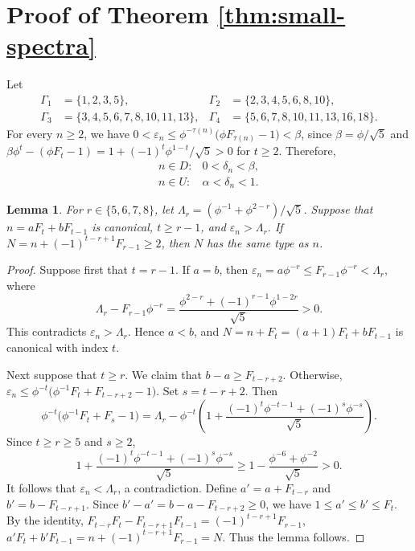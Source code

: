 \documentclass[11pt]{amsart}
\newtheorem{lemma}[theorem]{Lemma}
\theoremstyle{definition}
\newcommand{\eps}{\varepsilon}
\begin{document}
\section{Proof of Theorem \ref{thm:small-spectra}}
Let
\[
\begin{aligned}
\Gamma_1&=\{1,2,3,5\},&
\Gamma_2&=\{2,3,4,5,6,8,10\},\\
\Gamma_3&=\{3,4,5,6,7,8,10,11,13\},&
\Gamma_4&=\{5,6,7,8,10,11,13,16,18\}.
\end{aligned}
\]
For every $n\geq2$, we have $0<\eps_n\leq\phi^{-\tau(n)}\bigl(\phi F_{\tau(n)}-1\bigr)<\beta$, since $\beta=\phi/\sqrt5$ and $\beta\phi^t-(\phi F_t-1)=1+(-1)^t\phi^{1-t}/\sqrt5>0$ for $t\ge2$. Therefore,
\begin{equation}\label{eq:phase-bounds}
\begin{array}{ll}
n\in D:&0<\delta_n<\beta,\\
n\in U:&\alpha<\delta_n<1.
\end{array}
\end{equation}

\begin{lemma}\label{lem:exact-shift}
For $r\in\{5,6,7,8\}$, let $\Lambda_r=(\phi^{-1}+\phi^{2-r})/\sqrt5$. Suppose that $n=aF_t+bF_{t-1}$ is canonical, $t\geq r-1$, and
$\eps_n>\Lambda_r$. If
$N=n+(-1)^{t-r+1}F_{r-1}\geq2$, then $N$ has the same type as
$n$.
\end{lemma}

\begin{proof}
Suppose first that  $t=r-1$. If $a=b$, then $\eps_n=a\phi^{-r}\leq F_{r-1}\phi^{-r}<\Lambda_r$, where
\[
\Lambda_r-F_{r-1}\phi^{-r}
=\frac{\phi^{2-r}+(-1)^{r-1}\phi^{1-2r}}{\sqrt5}>0.
\]
This contradicts $\eps_n>\Lambda_r$. Hence $a<b$, and $N=n+F_t=(a+1)F_t+bF_{t-1}$ is canonical with index $t$.

Next suppose that $t\geq r$. We claim that $b-a\geq F_{t-r+2}$. Otherwise, $\eps_n\leq\phi^{-t}\bigl(\phi^{-1}F_t+F_{t-r+2}-1\bigr)$. Set $s=t-r+2$. Then
\[
\phi^{-t}\bigl(\phi^{-1}F_t+F_s-1\bigr)
=\Lambda_r-\phi^{-t}\left(
1+\frac{(-1)^t\phi^{-t-1}+(-1)^s\phi^{-s}}{\sqrt5}
\right).
\]
Since $t\geq r\geq5$ and $s\geq2$,
\[
1+\frac{(-1)^t\phi^{-t-1}+(-1)^s\phi^{-s}}{\sqrt5}
\geq
1-\frac{\phi^{-6}+\phi^{-2}}{\sqrt5}>0.
\]
It follows that $\eps_n<\Lambda_r$, a contradiction. Define $a'=a+F_{t-r}$ and $b'=b-F_{t-r+1}$. Since $b'-a'=b-a-F_{t-r+2}\geq0$, we have $1\leq a'\leq b'\leq F_t$. By the identity, $F_{t-r}F_t-F_{t-r+1}F_{t-1}=(-1)^{t-r+1}F_{r-1}$, $a'F_t+b'F_{t-1}=n+(-1)^{t-r+1}F_{r-1}=N$. Thus the lemma follows.
\end{proof}
\end{document}
